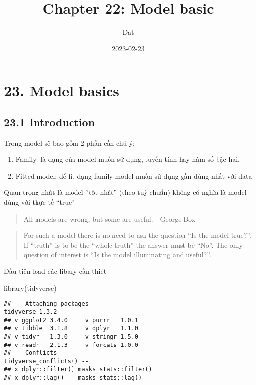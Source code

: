\documentclass[
]{article}
\title{Chapter 22: Model basic}
\author{Dat}
\date{2023-02-23}
\newenvironment{Shaded}{\begin{snugshade}}{\end{snugshade}}
\newcommand{\FunctionTok}[1]{\textcolor[rgb]{0.00,0.00,0.00}{#1}}
\newcommand{\NormalTok}[1]{#1}
\providecommand{\tightlist}{%
  \setlength{\itemsep}{0pt}\setlength{\parskip}{0pt}}
\begin{document}
\maketitle

\hypertarget{model-basics}{%
\section{23. Model basics}\label{model-basics}}

\hypertarget{introduction}{%
\subsection{23.1 Introduction}\label{introduction}}

Trong model sẽ bao gồm 2 phần cần chú ý:

\begin{enumerate}
\def\labelenumi{\arabic{enumi}.}
\tightlist
\item
  Family: là dạng của model muốn sử dụng, tuyến tính hay hàm số bậc hai.
\item
  Fitted model: để fit dạng family model muốn sử dụng gần đúng nhất với
  data
\end{enumerate}

Quan trọng nhất là model ``tốt nhất'' (theo tuỳ chuẩn) không có nghĩa là
model đúng với thực tế ``true''

\begin{quote}
All models are wrong, but some are useful. - George Box
\end{quote}

\begin{quote}
For such a model there is no need to ask the question ``Is the model
true?''. If ``truth'' is to be the ``whole truth'' the answer must be
``No''. The only question of interest is ``Is the model illuminating and
useful?''.
\end{quote}

Đầu tiên load các libary cần thiết

\begin{Shaded}
\begin{Highlighting}[]
\FunctionTok{library}\NormalTok{(tidyverse)}
\end{Highlighting}
\end{Shaded}

\begin{verbatim}
## -- Attaching packages --------------------------------------- tidyverse 1.3.2 --
## v ggplot2 3.4.0     v purrr   1.0.1
## v tibble  3.1.8     v dplyr   1.1.0
## v tidyr   1.3.0     v stringr 1.5.0
## v readr   2.1.3     v forcats 1.0.0
## -- Conflicts ------------------------------------------ tidyverse_conflicts() --
## x dplyr::filter() masks stats::filter()
## x dplyr::lag()    masks stats::lag()
\end{verbatim}
\end{document}
